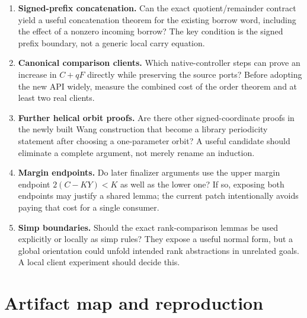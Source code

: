 \documentclass[11pt,a4paper]{article}
\begin{document}
\begin{enumerate}
\item \textbf{Signed-prefix concatenation.} Can the exact quotient/remainder contract yield a useful concatenation theorem for the existing borrow word, including the effect of a nonzero incoming borrow? The key condition is the signed prefix boundary, not a generic local carry equation.
\item \textbf{Canonical comparison clients.} Which native-controller steps can prove an increase in \(C+qF\) directly while preserving the source ports? Before adopting the new API widely, measure the combined cost of the order theorem and at least two real clients.
\item \textbf{Further helical orbit proofs.} Are there other signed-coordinate proofs in the newly built Wang construction that become a library periodicity statement after choosing a one-parameter orbit? A useful candidate should eliminate a complete argument, not merely rename an induction.
\item \textbf{Margin endpoints.} Do later finalizer arguments use the upper margin endpoint \(2(C-KY)<K\) as well as the lower one? If so, exposing both endpoints may justify a shared lemma; the current patch intentionally avoids paying that cost for a single consumer.
\item \textbf{Simp boundaries.} Should the exact rank-comparison lemmas be used explicitly or locally as simp rules? They expose a useful normal form, but a global orientation could unfold intended rank abstractions in unrelated goals. A local client experiment should decide this.
\end{enumerate}

\clearpage
\section{Artifact map and reproduction}
\end{document}
